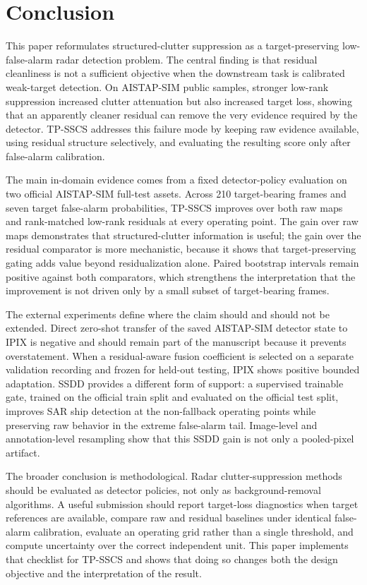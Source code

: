 \documentclass[journal]{IEEEtran}
\begin{document}
\section{Conclusion}

This paper reformulates structured-clutter suppression as a target-preserving low-false-alarm radar detection problem. The central finding is that residual cleanliness is not a sufficient objective when the downstream task is calibrated weak-target detection. On AISTAP-SIM public samples, stronger low-rank suppression increased clutter attenuation but also increased target loss, showing that an apparently cleaner residual can remove the very evidence required by the detector. TP-SSCS addresses this failure mode by keeping raw evidence available, using residual structure selectively, and evaluating the resulting score only after false-alarm calibration.

The main in-domain evidence comes from a fixed detector-policy evaluation on two official AISTAP-SIM full-test assets. Across 210 target-bearing frames and seven target false-alarm probabilities, TP-SSCS improves over both raw maps and rank-matched low-rank residuals at every operating point. The gain over raw maps demonstrates that structured-clutter information is useful; the gain over the residual comparator is more mechanistic, because it shows that target-preserving gating adds value beyond residualization alone. Paired bootstrap intervals remain positive against both comparators, which strengthens the interpretation that the improvement is not driven only by a small subset of target-bearing frames.

The external experiments define where the claim should and should not be extended. Direct zero-shot transfer of the saved AISTAP-SIM detector state to IPIX is negative and should remain part of the manuscript because it prevents overstatement. When a residual-aware fusion coefficient is selected on a separate validation recording and frozen for held-out testing, IPIX shows positive bounded adaptation. SSDD provides a different form of support: a supervised trainable gate, trained on the official train split and evaluated on the official test split, improves SAR ship detection at the non-fallback operating points while preserving raw behavior in the extreme false-alarm tail. Image-level and annotation-level resampling show that this SSDD gain is not only a pooled-pixel artifact.

The broader conclusion is methodological. Radar clutter-suppression methods should be evaluated as detector policies, not only as background-removal algorithms. A useful submission should report target-loss diagnostics when target references are available, compare raw and residual baselines under identical false-alarm calibration, evaluate an operating grid rather than a single threshold, and compute uncertainty over the correct independent unit. This paper implements that checklist for TP-SSCS and shows that doing so changes both the design objective and the interpretation of the result.
\end{document}
